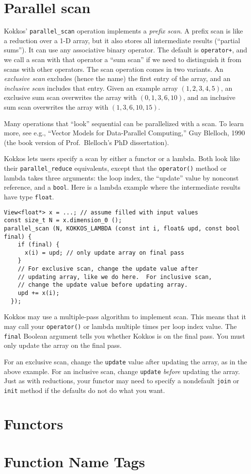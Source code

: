 \section{Parallel scan}

Kokkos' \lstinline!parallel_scan! operation implements a \emph{prefix scan}.
A prefix scan is like a reduction over a 1-D array,
but it also stores all intermediate results (``partial sums'').
It can use any associative binary operator.
The default is \lstinline!operator+!, 
and we call a scan with that operator a ``sum scan''
if we need to distinguish it from scans with other operators.
The scan operation comes in two variants.
An \emph{exclusive scan} excludes (hence the name) the first entry of the array,
and an \emph{inclusive scan} includes that entry.
Given an example array $(1, 2, 3, 4, 5)$, 
an exclusive sum scan overwrites the array with $(0, 1, 3, 6, 10)$,
and an inclusive sum scan overwrites the array with $(1, 3, 6, 10, 15)$.

Many operations that ``look'' sequential can be parallelized with a
scan.  To learn more, see e.g., ``Vector Models for Data-Parallel
Computing,'' Guy Blelloch, 1990 (the book version of Prof.\ Blelloch's
PhD dissertation).

Kokkos lets users specify a scan by either a functor or a lambda.
Both look like their \lstinline!parallel_reduce! equivalents,
except that the \lstinline!operator()! method or lambda takes three arguments:
the loop index, the ``update'' value by nonconst reference, and a \lstinline!bool!.
Here is a lambda example where the intermediate results have type \lstinline!float!.
\begin{lstlisting}
View<float*> x = ...; // assume filled with input values
const size_t N = x.dimension_0 ();
parallel_scan (N, KOKKOS_LAMBDA (const int i, float& upd, const bool final) {
    if (final) {
      x(i) = upd; // only update array on final pass
    }
    // For exclusive scan, change the update value after 
    // updating array, like we do here.  For inclusive scan, 
    // change the update value before updating array.
    upd += x(i); 
  });
\end{lstlisting}
Kokkos may use a multiple-pass algorithm to implement scan.
This means that it may call your \lstinline!operator()! or lambda multiple times per loop index value.
The \lstinline!final! Boolean argument tells you whether Kokkos is on the final pass.
You must only update the array on the final pass.

For an exclusive scan, change the \lstinline!update! value after
updating the array, as in the above example.  For an inclusive scan,
change \lstinline!update! \emph{before} updating the array.  Just as
with reductions, your functor may need to specify a nondefault
\lstinline!join! or \lstinline!init! method if the defaults do not do
what you want.

\section{Functors}
\section{Function Name Tags}
